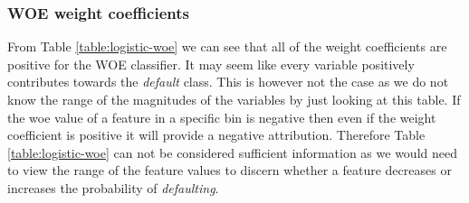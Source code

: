 \subsubsection{WOE weight coefficients}
From Table \ref{table:logistic-woe} we can see that all of the weight coefficients are positive for the WOE classifier. It may seem like every variable positively contributes towards the \emph{default} class. This is however not the case as we do not know the range of the magnitudes of the variables by just looking at this table. If the woe value of a feature in a specific bin is negative then even if the weight coefficient is positive it will provide a negative attribution. Therefore Table \ref{table:logistic-woe} can not be considered sufficient information as we would need to view the range of the feature values to discern whether a feature decreases or increases the probability of \emph{defaulting}.

